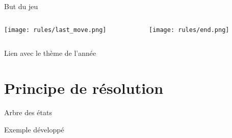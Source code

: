         \begin{frame}{But du jeu}
            \centering
            \begin{columns}
                \begin{column}{0.5\textwidth}
                    \texttt{[image: rules/last\_move.png]}
                \end{column}
                \begin{column}{0.5\textwidth}
                    \texttt{[image: rules/end.png]}
                \end{column}
            \end{columns}
        \end{frame}

        \begin{frame}{Lien avec le thème de l'année}
            \centering
        \end{frame}

    \section{Principe de résolution}
            \begin{frame}{Arbre des états}
                \centering
                \begin{customtree}
                    
                \end{customtree}
            \end{frame}

            \begin{frame}{Exemple développé}
                \begin{adjustbox}{max totalsize={\textwidth}{\textheight}, center}
                    \begin{customtree}
                        
                    \end{customtree}
                \end{adjustbox}
            \end{frame}

